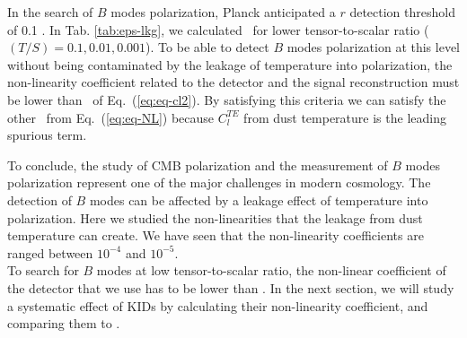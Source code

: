 In the search of $B$ modes polarization, Planck anticipated a $r$ detection threshold of 0.1 . In Tab. \ref{tab:eps-lkg}, we calculated \eps\ for lower tensor-to-scalar ratio ($(T/S) = 0.1, 0.01, 0.001$). To be able to detect $B$ modes polarization at this level without being contaminated by the leakage of temperature into polarization, the non-linearity coefficient related to the detector and the signal reconstruction must be lower than \eps\ of Eq.~(\ref{eq:eq-cl2}). By satisfying this criteria we can satisfy the other \eps\ from Eq.~(\ref{eq:eq-NL}) because $C_{l}^{TE}$ from dust temperature is the leading spurious term. 

To conclude, the study of CMB polarization and the measurement of $B$ modes polarization represent one of the major challenges in modern cosmology. The detection of $B$ modes can be affected by a leakage effect of temperature into polarization. Here we studied the non-linearities that the leakage from dust temperature can create. We have seen that the non-linearity coefficients are ranged between $10^{-4}$ and $10^{-5}$.\\

To search for $B$ modes at low tensor-to-scalar ratio, the non-linear coefficient of the detector that we use has to be lower than \eps . In the next section, we will study a systematic effect of KIDs by calculating their non-linearity coefficient, and comparing them to \eps .